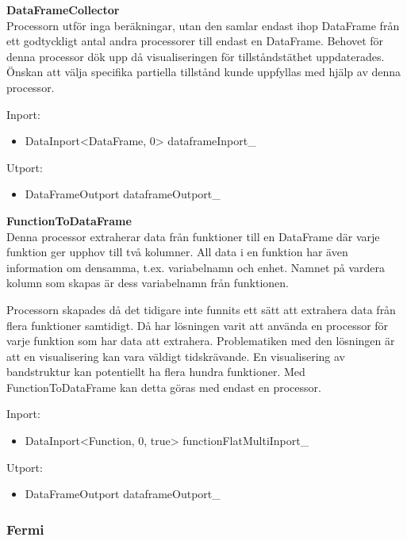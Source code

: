 \documentclass[10pt,oneside,swedish]{article}
\providecommand{\tightlist}{%
  \setlength{\itemsep}{0pt}\setlength{\parskip}{0pt}}
\begin{document}
\textbf{DataFrameCollector}\\
Processorn utför inga beräkningar, utan den samlar endast ihop DataFrame
från ett godtyckligt antal andra processorer till endast en DataFrame.
Behovet för denna processor dök upp då visualiseringen för
tillståndstäthet uppdaterades. Önskan att välja specifika partiella
tillstånd kunde uppfyllas med hjälp av denna processor.

Inport:

\begin{itemize}
\tightlist
\item
  DataInport\textless{}DataFrame, 0\textgreater{} dataframeInport\_
\end{itemize}

Utport:

\begin{itemize}
\tightlist
\item
  DataFrameOutport dataframeOutport\_
\end{itemize}

\textbf{FunctionToDataFrame}\\
Denna processor extraherar data från funktioner till en DataFrame där
varje funktion ger upphov till två kolumner. All data i en funktion har
även information om densamma, t.ex. variabelnamn och enhet. Namnet på
vardera kolumn som skapas är dess variabelnamn från funktionen.

Processorn skapades då det tidigare inte funnits ett sätt att extrahera
data från flera funktioner samtidigt. Då har lösningen varit att använda
en processor för varje funktion som har data att extrahera.
Problematiken med den lösningen är att en visualisering kan vara väldigt
tidskrävande. En visualisering av bandstruktur kan potentiellt ha flera
hundra funktioner. Med FunctionToDataFrame kan detta göras med endast en
processor.

Inport:

\begin{itemize}
\tightlist
\item
  DataInport\textless{}Function, 0, true\textgreater{}
  functionFlatMultiInport\_
\end{itemize}

Utport:

\begin{itemize}
\tightlist
\item
  DataFrameOutport dataframeOutport\_
\end{itemize}

\subsubsection{Fermi}\label{fermi}
\end{document}
